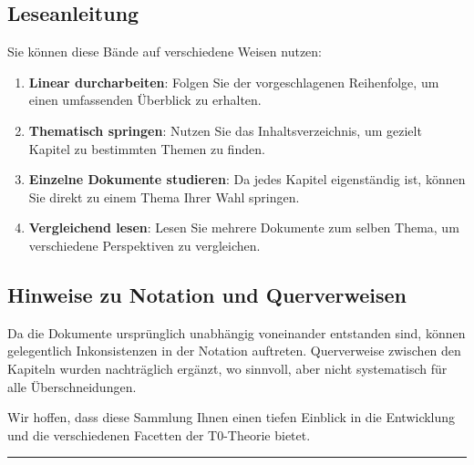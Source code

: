 \subsection*{Leseanleitung}

Sie können diese Bände auf verschiedene Weisen nutzen:

\begin{enumerate}
\item \textbf{Linear durcharbeiten}: Folgen Sie der vorgeschlagenen Reihenfolge, um einen umfassenden Überblick zu erhalten.

\item \textbf{Thematisch springen}: Nutzen Sie das Inhaltsverzeichnis, um gezielt Kapitel zu bestimmten Themen zu finden.

\item \textbf{Einzelne Dokumente studieren}: Da jedes Kapitel eigenständig ist, können Sie direkt zu einem Thema Ihrer Wahl springen.

\item \textbf{Vergleichend lesen}: Lesen Sie mehrere Dokumente zum selben Thema, um verschiedene Perspektiven zu vergleichen.
\end{enumerate}

\subsection*{Hinweise zu Notation und Querverweisen}

Da die Dokumente ursprünglich unabhängig voneinander entstanden sind, können gelegentlich Inkonsistenzen in der Notation auftreten. Querverweise zwischen den Kapiteln wurden nachträglich ergänzt, wo sinnvoll, aber nicht systematisch für alle Überschneidungen.

\vspace{1em}
\noindent
Wir hoffen, dass diese Sammlung Ihnen einen tiefen Einblick in die Entwicklung und die verschiedenen Facetten der T0-Theorie bietet.

\vfill

\begin{center}
\rule{0.5\textwidth}{0.4pt}
\end{center}
